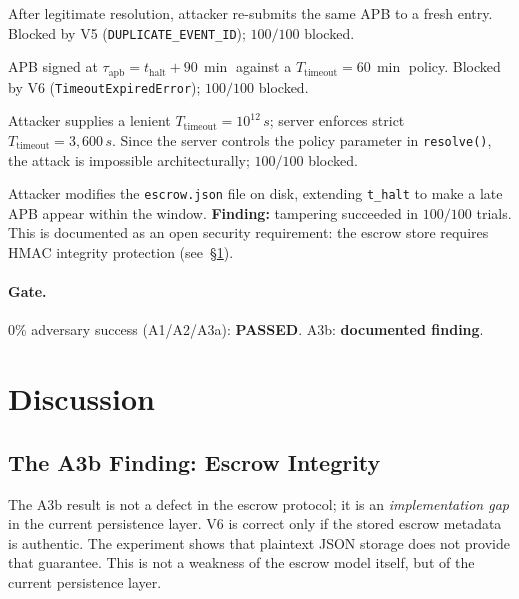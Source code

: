 \documentclass[11pt]{article}
\newcommand{\tapb}{\tau_{\mathrm{apb}}}
\newcommand{\Ttimeout}{T_{\mathrm{timeout}}}
\begin{document}
\begin{description}[itemsep=3pt]
  \item[A1 --- Replay event\_id.] After legitimate resolution, attacker
    re-submits the same APB to a fresh entry. Blocked by V5
    (\texttt{DUPLICATE\_EVENT\_ID}); $100/100$ blocked.

  \item[A2 --- APB post-timeout.] APB signed at
    $\tapb = t_{\mathrm{halt}} + 90\,\si{\min}$ against a
    $\Ttimeout=60\,\si{\min}$ policy.
    Blocked by V6 (\texttt{TimeoutExpiredError}); $100/100$ blocked.

  \item[A3a --- Policy forgery.] Attacker supplies a lenient
    $\Ttimeout = 10^{12}\,\si{s}$; server enforces strict
    $\Ttimeout = 3{,}600\,\si{s}$. Since the server controls
    the policy parameter in \texttt{resolve()}, the attack is
    impossible architecturally; $100/100$ blocked.

  \item[A3b --- Queue file tampering.] Attacker modifies the
    \texttt{escrow.json} file on disk, extending \texttt{t\_halt}
    to make a late APB appear within the window.
    \textbf{Finding:} tampering succeeded in $100/100$ trials.
    This is documented as an open security requirement: the escrow
    store requires HMAC integrity protection (see~\S\ref{sec:discussion}).
\end{description}

\paragraph{Gate.} $0\%$ adversary success (A1/A2/A3a):
\textbf{PASSED}. A3b: \textbf{documented finding}.

\section{Discussion}
\label{sec:discussion}

\subsection{The A3b Finding: Escrow Integrity}

The A3b result is not a defect in the escrow protocol; it is an
\emph{implementation gap} in the current persistence layer. V6 is
correct only if the stored escrow metadata is authentic. The
experiment shows that plaintext JSON storage does not provide that
guarantee. This is not a weakness of the escrow model itself, but of
the current persistence layer.
\end{document}
